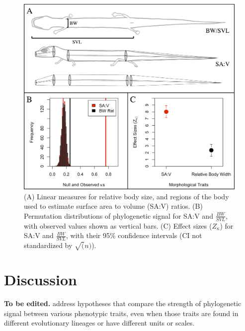 \documentclass[9pt,twocolumn,twoside,lineno]{pnas-new}
\begin{document}
\begin{figure}
\centering
\includegraphics{new.fig.4.png}
\caption{(A) Linear measures for relative body size, and regions of the
body used to estimate surface area to volume (SA:V) ratios. (B)
Permutation distributions of phylogenetic signal for SA:V and
\(\frac{BW}{SVL}\), with observed values shown as vertical bars. (C)
Effect sizes (\(Z_\kappa\)) for SA:V and \(\frac{BW}{SVL}\), with their
95\% confidence intervals (CI not standardized by \(\sqrt(n)\)).{}}
\end{figure}

\hypertarget{discussion}{%
\section{Discussion}\label{discussion}}

\textbf{To be edited.} address hypotheses that compare the strength of
phylogenetic signal between various phenotypic traits, even when those
traits are found in different evolutionary lineages or have different
units or scales.
\end{document}
